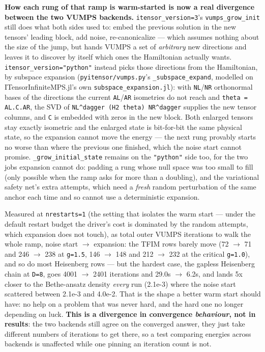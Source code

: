 \documentclass[11pt]{article}
\begin{document}
\textbf{How each rung of that ramp is warm-started is now a real
divergence between the two VUMPS backends.}
\texttt{itensor\_version=3}'s \texttt{vumps\_grow\_init} still does what
both sides used to: embed the previous solution in the new tensors'
leading block, add noise, re-canonicalize --- which assumes nothing about
the size of the jump, but hands VUMPS a set of \emph{arbitrary} new
directions and leaves it to discover by itself which ones the Hamiltonian
actually wants. \texttt{itensor\_version="python"} instead picks those
directions from the Hamiltonian, by subspace expansion
(\texttt{pyitensor/vumps.py}'s \texttt{\_subspace\_expand}, modelled on
ITensorInfiniteMPS.jl's own \texttt{subspace\_expansion.jl}): with
\texttt{NL}/\texttt{NR} orthonormal bases of the directions the current
\texttt{AL}/\texttt{AR} isometries do not reach and
\texttt{theta = AL.C.AR}, the SVD of
\texttt{NL\^{}dagger (H2 theta) NR\^{}dagger} supplies the new tensor
columns, and \texttt{C} is embedded with zeros in the new block. Both
enlarged tensors stay exactly isometric and the enlarged state is
bit-for-bit the same physical state, so the expansion cannot move the
energy --- the next rung provably starts no worse than where the previous
one finished, which the noise start cannot promise.
\texttt{\_grow\_initial\_state} remains on the \texttt{"python"} side too,
for the two jobs expansion cannot do: padding a rung whose null space was
too small to fill (only possible when the ramp asks for more than a
doubling), and the variational safety net's extra attempts, which need a
\emph{fresh} random perturbation of the same anchor each time and so
cannot use a deterministic expansion.

Measured at \texttt{nrestarts=1} (the setting that isolates the warm
start --- under the default restart budget the driver's cost is dominated
by the random attempts, which expansion does not touch), as total outer
VUMPS iterations to walk the whole ramp, noise start $\to$ expansion: the
TFIM rows barely move (72 $\to$ 71 and 246 $\to$ 238 at \texttt{g=1.5},
146 $\to$ 148 and 212 $\to$ 232 at the critical \texttt{g=1.0}), and so do
most Heisenberg rows --- but the hardest case, the gapless Heisenberg
chain at \texttt{D=8}, goes 4001 $\to$ 2401 iterations and 29.0s $\to$
6.2s, and lands 5x closer to the Bethe-ansatz density \emph{every} run
(2.1e-3) where the noise start scattered between 2.1e-3 and 4.0e-2. That
is the shape a better warm start should have: no help on a problem that
was never hard, and the hard one no longer depending on luck.
\textbf{This is a divergence in convergence \emph{behaviour}, not in
results}: the two backends still agree on the converged answer, they just
take different numbers of iterations to get there, so a test comparing
energies across backends is unaffected while one pinning an iteration
count is not.
\end{document}
